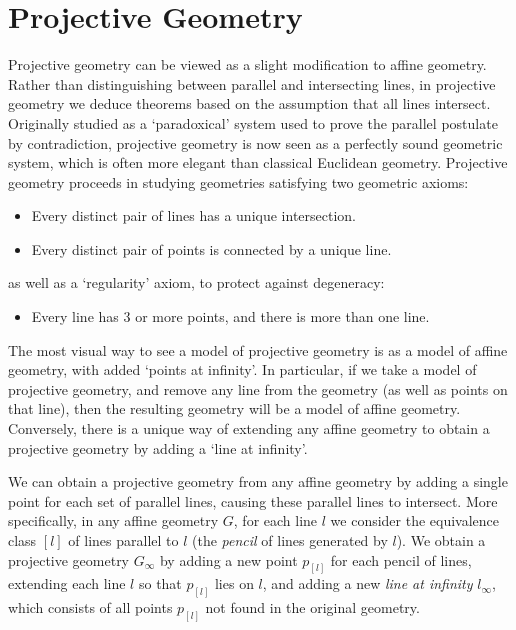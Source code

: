\chapter{Projective Geometry}

Projective geometry can be viewed as a slight modification to affine geometry. Rather than distinguishing between parallel and intersecting lines, in projective geometry we deduce theorems based on the assumption that all lines intersect. Originally studied as a `paradoxical' system used to prove the parallel postulate by contradiction, projective geometry is now seen as a perfectly sound geometric system, which is often more elegant than classical Euclidean geometry. Projective geometry proceeds in studying geometries satisfying two geometric axioms:
%
\begin{itemize}
    \item Every distinct pair of lines has a unique intersection.
    \item Every distinct pair of points is connected by a unique line.
\end{itemize}
%
as well as a `regularity' axiom, to protect against degeneracy:
%
\begin{itemize}
    \item Every line has 3 or more points, and there is more than one line.
\end{itemize}
%
The most visual way to see a model of projective geometry is as a model of affine geometry, with added `points at infinity'. In particular, if we take a model of projective geometry, and remove any line from the geometry (as well as points on that line), then the resulting geometry will be a model of affine geometry. Conversely, there is a unique way of extending any affine geometry to obtain a projective geometry by adding a `line at infinity'.

\begin{example}
    We can obtain a projective geometry from any affine geometry by adding a single point for each set of parallel lines, causing these parallel lines to intersect. More specifically, in any affine geometry $G$, for each line $l$ we consider the equivalence class $[l]$ of lines parallel to $l$ (the {\it pencil} of lines generated by $l$). We obtain a projective geometry $G_\infty$ by adding a new point $p_{[l]}$ for each pencil of lines, extending each line $l$ so that $p_{[l]}$ lies on $l$, and adding a new {\it line at infinity} $l_\infty$, which consists of all points $p_{[l]}$ not found in the original geometry.
\end{example}

